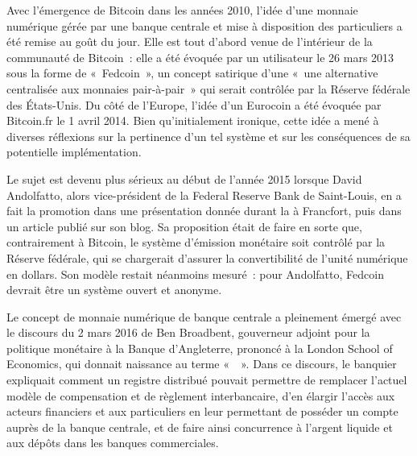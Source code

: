 Avec l'émergence de Bitcoin dans les années 2010, l'idée d'une monnaie numérique gérée par une banque centrale et mise à disposition des particuliers a été remise au goût du jour. Elle est tout d'abord venue de l'intérieur de la communauté de Bitcoin~: elle a été évoquée par un utilisateur le 26 mars 2013 sous la forme de «~Fedcoin~», un concept satirique d'une «~une alternative centralisée aux monnaies pair-à-pair~» qui serait contrôlée par la Réserve fédérale des États-Unis. Du côté de l'Europe, l'idée d'un Eurocoin a été évoquée par Bitcoin.fr le 1\ier{} avril 2014. Bien qu'initialement ironique, cette idée a mené à diverses réflexions sur la pertinence d'un tel système et sur les conséquences de sa potentielle implémentation.

Le sujet est devenu plus sérieux au début de l'année 2015 lorsque David Andolfatto, alors vice-président de la Federal Reserve Bank de Saint-Louis, en a fait la promotion dans une présentation donnée durant la  à Francfort, puis dans un article publié sur son blog. Sa proposition était de faire en sorte que, contrairement à Bitcoin, le système d'émission monétaire soit contrôlé par la Réserve fédérale, qui se chargerait d'assurer la convertibilité de l'unité numérique en dollars. Son modèle restait néanmoins mesuré~: pour Andolfatto, Fedcoin devrait être un système ouvert et anonyme.

Le concept de monnaie numérique de banque centrale a pleinement émergé avec le discours du 2 mars 2016 de Ben Broadbent, gouverneur adjoint pour la politique monétaire à la Banque d'Angleterre, prononcé à la London School of Economics, qui donnait naissance au terme «~~». Dans ce discours, le banquier expliquait comment un registre distribué pouvait permettre de remplacer l'actuel modèle de compensation et de règlement interbancaire, d'en élargir l'accès aux acteurs financiers et aux particuliers en leur permettant de posséder un compte auprès de la banque centrale, et de faire ainsi concurrence à l'argent liquide et aux dépôts dans les banques commerciales.


